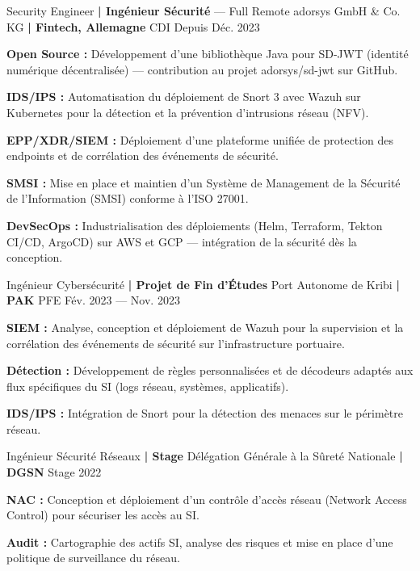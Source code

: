 \cventry
{Security Engineer \textbf{| Ingénieur Sécurité} — Full Remote} %
{adorsys GmbH \& Co. KG \textbf{| Fintech, Allemagne}} %
{CDI} %
{Depuis Déc. 2023} %
\begin{cvitems}
\item {\textbf{Open Source :} Développement d'une bibliothèque Java pour SD-JWT (identité numérique décentralisée) — contribution au projet adorsys/sd-jwt sur GitHub.}
\item {\textbf{IDS/IPS :} Automatisation du déploiement de Snort 3 avec Wazuh sur Kubernetes pour la détection et la prévention d'intrusions réseau (NFV).}
\item {\textbf{EPP/XDR/SIEM :} Déploiement d'une plateforme unifiée de protection des endpoints et de corrélation des événements de sécurité.}
\item {\textbf{SMSI :} Mise en place et maintien d'un Système de Management de la Sécurité de l'Information (SMSI) conforme à l'ISO 27001.}
\item {\textbf{DevSecOps :} Industrialisation des déploiements (Helm, Terraform, Tekton CI/CD, ArgoCD) sur AWS et GCP — intégration de la sécurité dès la conception.}
\end{cvitems}

\cventry
{Ingénieur Cybersécurité \textbf{| Projet de Fin d'Études}} %
{Port Autonome de Kribi \textbf{| PAK}} %
{PFE} %
{Fév. 2023 — Nov. 2023} %
\begin{cvitems}
\item {\textbf{SIEM :} Analyse, conception et déploiement de Wazuh pour la supervision et la corrélation des événements de sécurité sur l'infrastructure portuaire.}
\item {\textbf{Détection :} Développement de règles personnalisées et de décodeurs adaptés aux flux spécifiques du SI (logs réseau, systèmes, applicatifs).}
\item {\textbf{IDS/IPS :} Intégration de Snort pour la détection des menaces sur le périmètre réseau.}
\end{cvitems}

\cventry
{Ingénieur Sécurité Réseaux \textbf{| Stage}} %
{Délégation Générale à la Sûreté Nationale \textbf{| DGSN}} %
{Stage} %
{2022} %
\begin{cvitems}
\item {\textbf{NAC :} Conception et déploiement d'un contrôle d'accès réseau (Network Access Control) pour sécuriser les accès au SI.}
\item {\textbf{Audit :} Cartographie des actifs SI, analyse des risques et mise en place d'une politique de surveillance du réseau.}
\end{cvitems}
